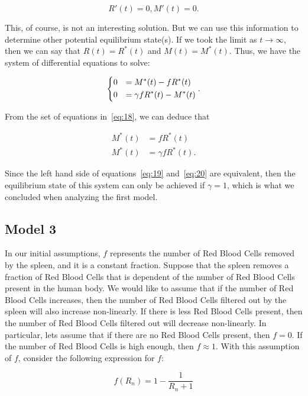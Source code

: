 \[
R'(t) = 0, M'(t) = 0.
\]

This, of course, is not an interesting solution. But we can use this information to determine other potential equilibrium state(s). If we took the limit as $t\to\infty$, then we can say that $R(t) = R^\ast(t)$ and $M(t) = M^\ast(t)$. Thus, we have the system of differential equations to solve:

\begin{equation}
    \begin{dcases}
        0 &= M^\ast(t)-fR^\ast(t)\\
        0 &= \gamma fR^\ast(t) - M^\ast(t)
    \end{dcases}.
    \label{eq:18}
\end{equation}

From the set of equations in~\eqref{eq:18}, we can deduce that

\begin{align}
    M^\ast(t) &= fR^\ast(t) \label{eq:19}\\
    M^\ast(t) &= \gamma fR^\ast(t). \label{eq:20}
\end{align}

Since the left hand side of equations~\eqref{eq:19} and~\eqref{eq:20} are equivalent, then the equilibrium state of this system can only be achieved if $\gamma = 1$, which is what we concluded when analyzing the first model.

\subsection{Model 3}
\label{subsec:model-3}

In our initial assumptions, $f$ represents the number of Red Blood Cells removed by the spleen, and it is a constant fraction. Suppose that the spleen removes a fraction of Red Blood Cells that is dependent of the number of Red Blood Cells present in the human body. We would like to assume that if the number of Red Blood Cells increases, then the number of Red Blood Cells filtered out by the spleen will also increase non-linearly. If there is less Red Blood Cells present, then the number of Red Blood Cells filtered out will decrease non-linearly. In particular, lets assume that if there are no Red Blood Cells present, then $f=0$. If the number of Red Blood Cells is high enough, then $f \approx 1$. With this assumption of $f$, consider the following expression for $f$:

\[
f(R_n) = 1 - \frac{1}{R_n+1}
\]


